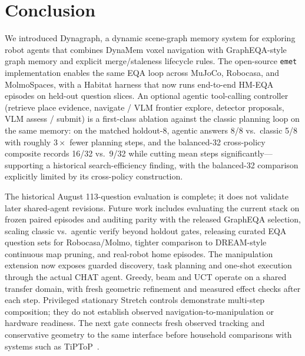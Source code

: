 \section{Conclusion}
\label{sec:conclusion}

We introduced Dynagraph, a dynamic scene-graph memory system for exploring robot agents that combines DynaMem voxel navigation with GraphEQA-style graph memory and explicit merge/staleness lifecycle rules.
The open-source \texttt{emet} implementation enables the same EQA loop across MuJoCo, Robocasa, and MolmoSpaces, with a Habitat harness that now runs end-to-end HM-EQA episodes on held-out question slices.
An optional agentic tool-calling controller (retrieve place evidence, navigate / VLM frontier explore, detector proposals, VLM assess / submit) is a first-class ablation against the classic planning loop on the same memory: on the matched holdout-8, agentic answers 8/8 vs.\ classic 5/8 with roughly $3\times$ fewer planning steps, and the balanced-32 cross-policy composite records 16/32 vs.\ 9/32 while cutting mean steps significantly---supporting a historical search-efficiency finding, with the balanced-32 comparison explicitly limited by its cross-policy construction.

The historical August 113-question evaluation is complete; it does not validate later shared-agent revisions. Future work includes evaluating the current stack on frozen paired episodes and auditing parity with the released GraphEQA selection, scaling classic vs.\ agentic verify beyond holdout gates, releasing curated EQA question sets for Robocasa/Molmo, tighter comparison to DREAM-style continuous map pruning, and real-robot home episodes.
The manipulation extension now exposes guarded discovery, task planning and
one-shot execution through the actual CHAT agent. Greedy, beam and UCT operate
on a shared transfer domain, with fresh geometric refinement and measured effect
checks after each step. Privileged stationary Stretch controls demonstrate
multi-step composition; they do not establish observed navigation-to-manipulation
or hardware readiness. The next gate connects fresh observed tracking and
conservative geometry to the same interface before household comparisons with
systems such as TiPToP~\citep{shen2026tiptop}.
